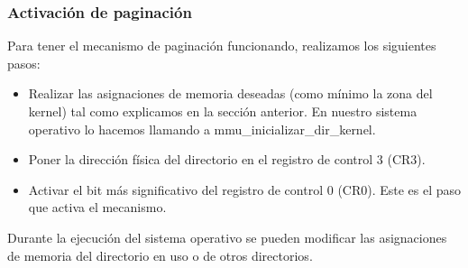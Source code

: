 \subsubsection{Activación de paginación}
Para tener el mecanismo de paginación funcionando, realizamos los siguientes pasos:
\begin{itemize}
\item Realizar las asignaciones de memoria deseadas (como mínimo la zona del kernel) tal como explicamos en la sección anterior. En nuestro sistema operativo lo hacemos llamando a mmu\_inicializar\_dir\_kernel.
\item Poner la dirección física del directorio en el registro de control 3 (CR3).
\item Activar el bit más significativo del registro de control 0 (CR0). Este es el paso que activa el mecanismo.
\end{itemize}
Durante la ejecución del sistema operativo se pueden modificar las asignaciones de memoria del directorio en uso o de otros directorios.

